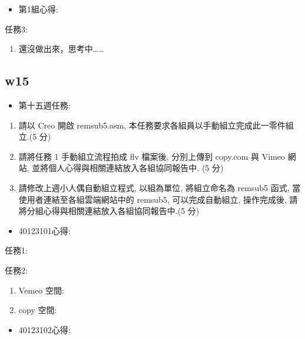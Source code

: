 \documentclass[]{article}
\begin{document}
\begin{itemize}
\itemsep1pt\parskip0pt
\item
  第1組心得:
\end{itemize}

任務3:

\begin{enumerate}
\def\labelenumi{\arabic{enumi}.}
\itemsep1pt\parskip0pt
\item
  還沒做出來，思考中\ldots{}\ldots{}
\end{enumerate}

\subsection{w15}\label{w15}

\begin{itemize}
\itemsep1pt\parskip0pt
\item
  第十五週任務:
\end{itemize}

\begin{enumerate}
\def\labelenumi{\arabic{enumi}.}
\item
  請以 Creo 開啟 remsub5.asm,
  本任務要求各組員以手動組立完成此一零件組立.(5 分)
\item
  請將任務 1 手動組立流程拍成 flv 檔案後, 分別上傳到 copy.com 與 Vimeo
  網站, 並將個人心得與相關連結放入各組協同報告中. (5 分)
\item
  請修改上週小人偶自動組立程式, 以組為單位, 將組立命名為 remsub5 函式,
  當使用者連結至各組雲端網站中的 remsub5, 可以完成自動組立, 操作完成後,
  請將分組心得與相關連結放入各組協同報告中.(5 分)
\end{enumerate}

\begin{itemize}
\itemsep1pt\parskip0pt
\item
  40123101心得:
\end{itemize}

任務1:

任務2:

\begin{enumerate}
\def\labelenumi{\arabic{enumi}.}
\item
  Vemeo 空間:
\item
  copy 空間:
\end{enumerate}

\begin{itemize}
\itemsep1pt\parskip0pt
\item
  40123102心得:
\end{itemize}
\end{document}
